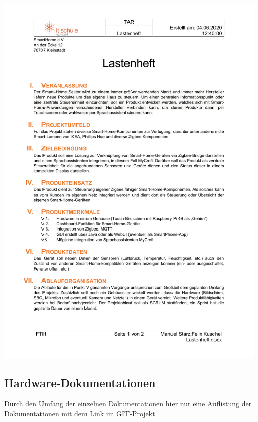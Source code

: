 \documentclass[12pt,a4paper]{article}
\begin{document}
 	\includegraphics[width=0.98\textwidth, page=2]{lastenheft.pdf}
 	\subsection{Hardware-Dokumentationen}
 	Durch den Umfang der einzelnen Dokumentationen hier nur eine Auflistung der Dokumentationen mit dem Link im GIT-Projekt.
 	
\end{document}
